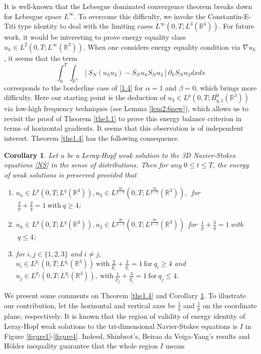 \documentclass[11pt]{article}
\theoremstyle{plain}\newtheorem{definition}{Definition}[section]
\theoremstyle{definition}\newtheorem{theorem}{Theorem}[section]
\theoremstyle{plain}\newtheorem{lemma}[theorem]{Lemma}
\theoremstyle{plain}\newtheorem{coro}[theorem]{Corollary}
\theoremstyle{plain}\newtheorem{prop}[theorem]{Proposition}
\theoremstyle{remark}\newtheorem{remark}{Remark}[section]
\newcommand{\f}{\frac}
\numberwithin{equation}{section}
\begin{document}
It is well-known that the Lebesgue dominated convergence theorem breaks down for Lebesgue space $L^{\infty}$. To overcome this difficulty, we invoke the Constantin-E-Titi type identity to deal with  the limiting cases $   L^{\infty}(0, T; L^3(\mathbb{R}^{3}))$. For
future work, it would be interesting to prove energy equality class $u_h\in L^{2}(0, T; L^\infty(\mathbb{R}^{3}))$.  When one considers  energy equality condition via $\nabla u_{h}$, it seems that
the term
$$\int_{0}^{T}\int_{\mathbb{R}^{3}} [S_{N}(u_{h}u_{3} )-S_{N} u_{h}S_{N}u_{3} ]\partial_{h} S_{N}u_{3} dxds$$
corresponds to the borderline case of \eqref{1.4} for $\alpha=1$ and $\beta=0$, which brings more difficulty. Here our starting point is the deduction of
$u_{3}\in L^{p}(0,T;B^{0}_{q,1}(\mathbb{R}^{3}))  $
via  low-high frequency techniques (see Lemma \ref{lem2.6new}), which allows us to revisit the proof of Theorem \ref{the1.1} to
prove this energy balance criterion in terms of horizontal gradients. It seems that this observation is of independent interest.
Theorem \ref{the1.4}  has the following   consequence.
\begin{coro}\label{coro1.5}Let $u$ be a Leray-Hopf weak solution to the 3D Navier-Stokes equations \eqref{NS}
in the sense of distributions.
Then for any $0\leq t\leq T$, the energy   of weak solutions   is preserved provided that
\begin{enumerate}[(1)]
  \item $u_h \in L^{p }(0,T;L^{q }(\mathbb{R}^{3})),u_3 \in L^{\f{2p }{p -2}}(0,T;L^{\f{2q }{q -2}}(\mathbb{R}^{3})),$~for$ ~\f{2}{p }+
 \f{2}{q }=1~\text{with} ~q \geq 4$;
 \item $u_h \in L^{p }(0,T;L^{q }(\mathbb{R}^{3})),u_3 \in L^{\f{2p }{p -2}}(0,T;L^{\f{2q }{q -2}}(\mathbb{R}^{3}))$~for~$\f{1}{p }+
 \f{3}{q }=1~$with $~q \leq 4$;
 \item  for $i,j\in\{1,2,3\}$ and $i\neq j$, $u_i \in L^{p_{i}}(0,T;L^{q_{i}}(\mathbb{R}^{3}))  ~\text{with}~\f{2}{p_{i}}+
 \f{2}{q_{i}}=1~\text{for}~q_{i}\geq 4$ and $u_j \in L^{p_{j}}(0,T;L^{q_{j}}(\mathbb{R}^{3})),~\text{with}~\f{1}{p_{j}}+
 \f{3}{q_{j}}=1~\text{for}~q_{j}\leq 4$.
 \end{enumerate}
\end{coro}
We present some comments on Theorem \ref{the1.4} and  Corollary \ref{coro1.5}.
To illustrate our contribution, let  the horizontal and vertical axes be $\f1q$ and $\f1p$  on the coordinate plane,   respectively.
It is known that the region  of  validity of energy identity of Leray-Hopf weak solutions to the tri-dimensional Navier-Stokes equations  is $I$ in Figure \ref{figure1}-\ref{figure4}. Indeed, Shinbrot's,  Beirao da Veiga-Yang's results and H\"older inequality guarantee that the whole  region $I$ means
\end{document}
